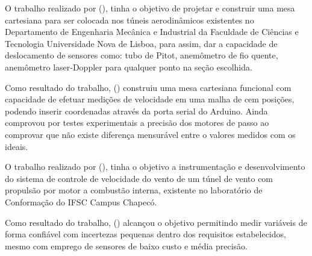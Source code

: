 O trabalho realizado por \citeauthor{ramos2018desenvolvimento} (\citeyear{ramos2018desenvolvimento}), 
tinha o objetivo de projetar e construir uma mesa cartesiana para ser colocada nos túneis 
aerodinâmicos existentes no Departamento de Engenharia Mecânica e Industrial da Faculdade de Ciências e 
Tecnologia Universidade Nova de Lisboa, para assim, dar a capacidade de deslocamento de sensores como: tubo de Pitot, 
anemômetro de fio quente, anemômetro laser-Doppler para qualquer ponto na seção escolhida.

Como resultado do trabalho, \citeauthor{ramos2018desenvolvimento} (\citeyear{ramos2018desenvolvimento}) construiu 
uma mesa cartesiana funcional com capacidade de efetuar medições de velocidade em uma malha de cem posições, 
podendo inserir coordenadas através da porta serial do Arduino. Ainda comprovou por testes experimentais a 
precisão dos motores de passo ao comprovar que não existe diferença mensurável entre o valores medidos com os ideais.

O trabalho realizado por \citeauthor{hoss2018implantaccao} (\citeyear{hoss2018implantaccao}), tinha o objetivo 
a instrumentação e desenvolvimento do sistema de controle de velocidade do vento de um túnel de vento com 
propulsão por motor a combustão interna, existente no laboratório de Conformação do IFSC Campus Chapecó.

Como resultado do trabalho, \citeauthor{hoss2018implantaccao} (\citeyear{hoss2018implantaccao}) alcançou o objetivo 
permitindo medir variáveis de forma confiável com incertezas pequenas dentro dos requisitos estabelecidos, mesmo 
com emprego de sensores de baixo custo e média precisão.
